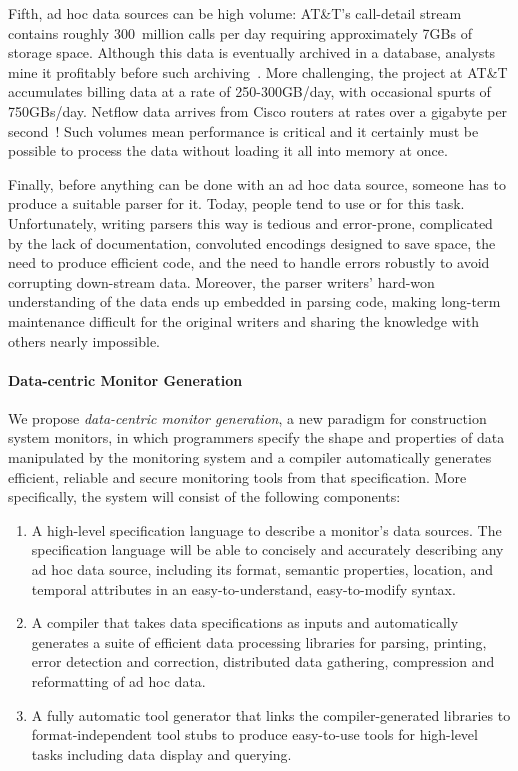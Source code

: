 \documentclass[10pt]{article}
\begin{document}
Fifth, ad hoc data sources can be high volume:
AT\&T's call-detail stream contains roughly 300~million calls per day
requiring approximately 7GBs of storage space. Although this data is
eventually archived in a database, analysts mine it profitably before
such archiving~\cite{kdd98,kdd99}. More challenging, the \ningaui{}
project at AT\&T accumulates billing data at a rate of 250-300GB/day,
with occasional spurts of 750GBs/day. Netflow data arrives from Cisco
routers at rates over a gigabyte per second~\cite{gigascope}! Such
volumes mean performance is critical and it certainly
must be possible to process the data without loading
it all into memory at once.

Finally, before anything can be done with an ad hoc data source,
someone has to produce a suitable parser for it.  Today, people tend
to use \C{} or \perl{} for this task.  Unfortunately, writing parsers
this way is tedious and error-prone, complicated by the lack of
documentation, convoluted encodings designed to save space, the need
to produce efficient code, and the need to handle errors robustly to
avoid corrupting down-stream data.  Moreover, the parser writers'
hard-won understanding of the data ends up embedded in parsing code,
making long-term maintenance difficult for the original writers and
sharing the knowledge with others nearly impossible.

\paragraph*{Data-centric Monitor Generation}
We propose {\em data-centric monitor generation}, a new paradigm
for construction system monitors, in which programmers
specify the shape and properties of data manipulated by
the monitoring system and a compiler automatically
generates efficient, reliable and secure
monitoring tools from that specification.
More specifically, the system will consist of the 
following components:

\begin{enumerate}

\item A high-level specification language to describe a monitor's
data sources.  The specification language will be able to
concisely and accurately describing any ad hoc data source,
including its format, semantic properties, location, and
temporal attributes in an easy-to-understand, easy-to-modify syntax.

\item A compiler that takes data specifications as inputs and
automatically generates a suite of 
efficient data processing libraries for parsing, printing, error detection
and correction, distributed data gathering, compression and 
reformatting of ad hoc data.

\item A fully automatic tool generator that links the compiler-generated 
libraries to format-independent tool stubs to produce easy-to-use 
tools for high-level tasks including data display and querying.

\end{enumerate}
\end{document}
